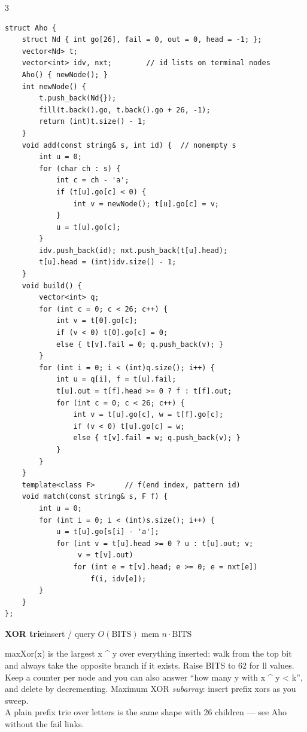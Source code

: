 \documentclass[9pt,a4paper]{extarticle}
\newcommand{\entry}[3]{%
  \addcontentsline{toc}{subsection}{#1}%
  \vspace{0.8ex}%
  \noindent\colorbox{hdbg}{\parbox{\dimexpr\columnwidth-2\fboxsep}{%
    \strut\textbf{#1}\hfill{\footnotesize\textsf{#2}}}}\par
  \vspace{0.4ex}%
  {\footnotesize #3\par}%
}
\newcommand{\code}[1]{{\ttfamily\small #1}}
\begin{document}
\begin{multicols*}{3}
\begin{lstlisting}
struct Aho {
    struct Nd { int go[26], fail = 0, out = 0, head = -1; };
    vector<Nd> t;
    vector<int> idv, nxt;        // id lists on terminal nodes
    Aho() { newNode(); }
    int newNode() {
        t.push_back(Nd{});
        fill(t.back().go, t.back().go + 26, -1);
        return (int)t.size() - 1;
    }
    void add(const string& s, int id) {  // nonempty s
        int u = 0;
        for (char ch : s) {
            int c = ch - 'a';
            if (t[u].go[c] < 0) {
                int v = newNode(); t[u].go[c] = v;
            }
            u = t[u].go[c];
        }
        idv.push_back(id); nxt.push_back(t[u].head);
        t[u].head = (int)idv.size() - 1;
    }
    void build() {
        vector<int> q;
        for (int c = 0; c < 26; c++) {
            int v = t[0].go[c];
            if (v < 0) t[0].go[c] = 0;
            else { t[v].fail = 0; q.push_back(v); }
        }
        for (int i = 0; i < (int)q.size(); i++) {
            int u = q[i], f = t[u].fail;
            t[u].out = t[f].head >= 0 ? f : t[f].out;
            for (int c = 0; c < 26; c++) {
                int v = t[u].go[c], w = t[f].go[c];
                if (v < 0) t[u].go[c] = w;
                else { t[v].fail = w; q.push_back(v); }
            }
        }
    }
    template<class F>       // f(end index, pattern id)
    void match(const string& s, F f) {
        int u = 0;
        for (int i = 0; i < (int)s.size(); i++) {
            u = t[u].go[s[i] - 'a'];
            for (int v = t[u].head >= 0 ? u : t[u].out; v;
                 v = t[v].out)
                for (int e = t[v].head; e >= 0; e = nxt[e])
                    f(i, idv[e]);
        }
    }
};
\end{lstlisting}

\entry{XOR trie}{insert / query $O(\mathrm{BITS})$ \quad mem $n \cdot \mathrm{BITS}$}{%
\code{maxXor(x)} is the largest \code{x \textasciicircum{} y} over everything inserted:
walk from the top bit and always take the opposite branch if it exists. Raise
\code{BITS} to 62 for \code{ll} values.\\[0.3ex]
Keep a counter per node and you can also answer ``how many \code{y} with
\code{x \textasciicircum{} y < k}'', and delete by decrementing. Maximum XOR
\emph{subarray}: insert prefix xors as you sweep.\\[0.3ex]
A plain prefix trie over letters is the same shape with 26 children --- see
\code{Aho} without the fail links.}


\end{multicols*}
\end{document}
